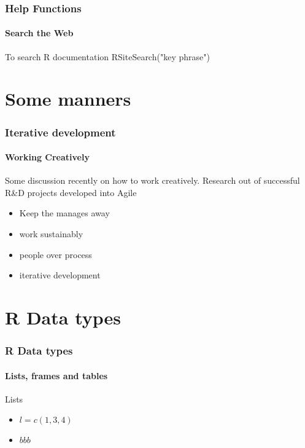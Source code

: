 \documentclass[12pt]{beamer}\usepackage[]{graphicx}\usepackage[]{color}
\begin{document}
\begin{frame}
  \frametitle{Help Functions}
  \framesubtitle{Search the Web}
\begin{block}{To search R documentation}
RSiteSearch("key phrase")
\end{block}


\end{frame}

\section*{Some manners}
\begin{frame}
  \frametitle{Iterative development}
  \framesubtitle{Working Creatively}
Some discussion recently on how to work creatively. Research out of  successful R\&D projects developed into Agile
\begin{itemize}
\item Keep the manages away
\item work sustainably
\item people over process
\item iterative development
\end{itemize}
\end{frame}

\section*{R Data types}
\begin{frame}
  \frametitle{R Data types}
  \framesubtitle{Lists, frames and tables}
  \begin{block}{Lists}
      \begin{itemize}
         \item $l=c(1,3,4)$
         \item $bbb$
      \end{itemize}
  \end{block}
\end{frame}  
\end{document}
